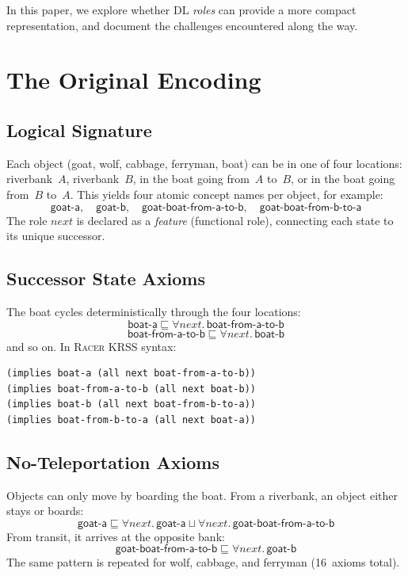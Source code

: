 \documentclass[11pt,a4paper]{article}
\newcommand{\DLall}[2]{\forall #1.\,#2}
\newcommand{\DLor}{\sqcup}
\newcommand{\DLsub}{\sqsubseteq}
\newcommand{\Racer}{\textsc{Racer}}
\newcommand{\concept}[1]{\ensuremath{\mathsf{#1}}}
\newcommand{\role}[1]{\ensuremath{\mathit{#1}}}
\begin{document}
In this paper, we explore whether DL \emph{roles} can provide a more
compact representation, and document the challenges encountered along
the way.

\section{The Original Encoding}
\label{sec:original}

\subsection{Logical Signature}

Each object (goat, wolf, cabbage, ferryman, boat) can be in one of four
locations: riverbank~$A$, riverbank~$B$, in the boat going from~$A$
to~$B$, or in the boat going from~$B$ to~$A$.  This yields four atomic
concept names per object, for example:
\[
\concept{goat\text{-}a}, \quad
\concept{goat\text{-}b}, \quad
\concept{goat\text{-}boat\text{-}from\text{-}a\text{-}to\text{-}b}, \quad
\concept{goat\text{-}boat\text{-}from\text{-}b\text{-}to\text{-}a}
\]
The role \role{next} is declared as a \emph{feature} (functional
role), connecting each state to its unique successor.

\subsection{Successor State Axioms}

The boat cycles deterministically through the four locations:
\[
\concept{boat\text{-}a} \DLsub \DLall{\role{next}}{\concept{boat\text{-}from\text{-}a\text{-}to\text{-}b}}
\]
\[
\concept{boat\text{-}from\text{-}a\text{-}to\text{-}b} \DLsub \DLall{\role{next}}{\concept{boat\text{-}b}}
\]
and so on.  In \Racer{} KRSS syntax:
\begin{lstlisting}[style=racer]
(implies boat-a (all next boat-from-a-to-b))
(implies boat-from-a-to-b (all next boat-b))
(implies boat-b (all next boat-from-b-to-a))
(implies boat-from-b-to-a (all next boat-a))
\end{lstlisting}

\subsection{No-Teleportation Axioms}

Objects can only move by boarding the boat. From a riverbank, an object
either stays or boards:
\[
\concept{goat\text{-}a} \DLsub
  \DLall{\role{next}}{\concept{goat\text{-}a}} \DLor
  \DLall{\role{next}}{\concept{goat\text{-}boat\text{-}from\text{-}a\text{-}to\text{-}b}}
\]
From transit, it arrives at the opposite bank:
\[
\concept{goat\text{-}boat\text{-}from\text{-}a\text{-}to\text{-}b} \DLsub
  \DLall{\role{next}}{\concept{goat\text{-}b}}
\]
The same pattern is repeated for wolf, cabbage, and ferryman (16~axioms total).
\end{document}
